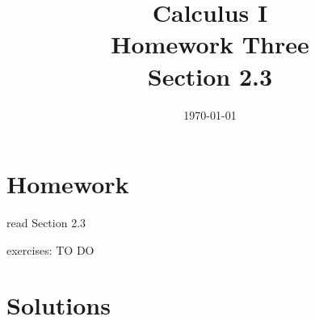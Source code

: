 \documentclass[letterpaper, landscape]{exam}
\title{Calculus I \\ Homework Three \\ Section 2.3}
\author{}
\date{\today}
\begin{document}
  \maketitle

  \section{Homework}
    \begin{itemize*}
      \item read Section 2.3
      \item exercises: TO DO
    \end{itemize*}

  \ifprintanswers

    \section{Solutions}
\end{document}
